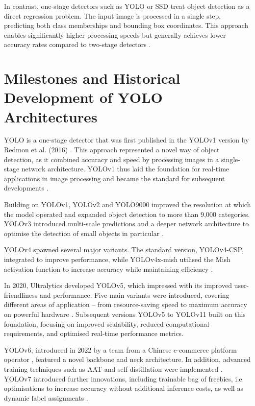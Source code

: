 In contrast, one-stage detectors such as \Acrfull{YOLO} \cite{redmon2016} or \Acrfull{SSD} \cite{Liu_2016} treat object detection as a direct regression problem. The input image is processed in a single step, predicting both class memberships and bounding box coordinates. This approach enables significantly higher processing speeds but generally achieves lower accuracy rates compared to two-stage detectors \cite{Soviany2018}.



\section{Milestones and Historical Development of YOLO Architectures}

\acrfull{YOLO} is a one-stage detector that was first published in the YOLOv1 version by Redmon et al. (2016) \cite{redmon2016}. This approach represented a novel way of object detection, as it combined accuracy and speed by processing images in a single-stage network architecture. YOLOv1 thus laid the foundation for real-time applications in image processing and became the standard for subsequent developments \cite{Sapkota2025}.

Building on YOLOv1, YOLOv2 and YOLO9000 \cite{Li2018,Nakahara2018} improved the resolution at which the model operated and expanded object detection to more than 9,000 categories. YOLOv3 introduced multi-scale predictions and a deeper network architecture to optimise the detection of small objects in particular \cite{Kim2018}.

YOLOv4 spawned several major variants. The standard version, YOLOv4-CSP, integrated  to improve performance, while YOLOv4x-mish utilised the Mish activation function to increase accuracy while maintaining efficiency \cite{Nepal2022,Sozzi2022,Mohod2023}.

In 2020, Ultralytics developed YOLOv5, which impressed with its improved user-friendliness and performance. Five main variants were introduced, covering different areas of application – from resource-saving speed to maximum accuracy on powerful hardware \cite{Sapkota2025,ultralyics_2020}. Subsequent versions YOLOv5 to YOLOv11 built on this foundation, focusing on improved scalability, reduced computational requirements, and optimised real-time performance metrics.

YOLOv6, introduced in 2022 by a team from a Chinese e-commerce platform operator \cite{li2022}, featured a novel backbone and neck architecture. In addition, advanced training techniques such as \acrfull{AAT} and self-distillation were implemented \cite{Sapkota2025,li2022}. YOLOv7 \cite{wang2022,Wang2023} introduced further innovations, including trainable bag of freebies, i.e. optimisations to increase accuracy without additional inference costs, as well as dynamic label assignments \cite{wang2022,Wang2023,Sapkota2025}.

